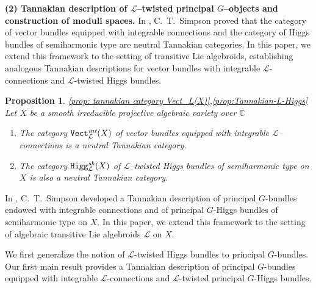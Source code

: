 \documentclass[12pt,reqno]{amsart}
\numberwithin{equation}{subsection}
\newtheorem{proposition}[equation]{Proposition}
\theoremstyle{definition}
\theoremstyle{theorem}
\begin{document}
\medskip

\noindent
\textbf{(2) Tannakian description of $\mathcal{L}$--twisted principal $G$--objects and construction of moduli spaces.}
In \cite[\S\,9]{CT. Simpson-1992}, C.~T.~Simpson proved that the category of vector bundles equipped with integrable connections and the category of Higgs bundles of semiharmonic type are neutral Tannakian categories. In this paper, we extend this framework to the setting of transitive Lie algebroids, establishing analogous Tannakian descriptions for vector bundles with integrable \(\mathcal{L}\)-connections and \(\mathcal{L}\)-twisted Higgs bundles.


\begin{proposition}\eqref{prop: tannakian category Vect_L(X)},\eqref{prop:Tannakian-L-Higgs}
Let $X$ be a smooth irreducible projective algebraic variety over $\mathbb{C}$
	\begin{enumerate}
		\item The category $\texttt{Vect}^{\emph{int}}_{\mathcal{L}}(X)$ of vector bundles equipped with integrable $\mathcal{L}$--connections is a neutral Tannakian category.
		\item The category $\texttt{Higg}^{\emph{sh}}_{\mathcal{L}}(X)$ of $\mathcal{L}$--twisted Higgs bundles of semiharmonic type on $X$ is also a neutral Tannakian category.
	\end{enumerate}
\end{proposition}

In \cite[\S\,9]{CT.Simpson-1995}, C.~T.~Simpson developed a Tannakian description of principal \(G\)-bundles endowed with integrable connections and of principal \(G\)-Higgs bundles of semiharmonic type on \(X\). In this paper, we extend this framework to the setting of algebraic transitive Lie algebroids \(\mathcal{L}\) on \(X\).

We first generalize the notion of \(\mathcal{L}\)-twisted Higgs bundles  to principal \(G\)-bundles. Our first main result provides a Tannakian description of principal \(G\)-bundles equipped with integrable \(\mathcal{L}\)-connections and \(\mathcal{L}\)-twisted principal \(G\)-Higgs bundles.
\end{document}
